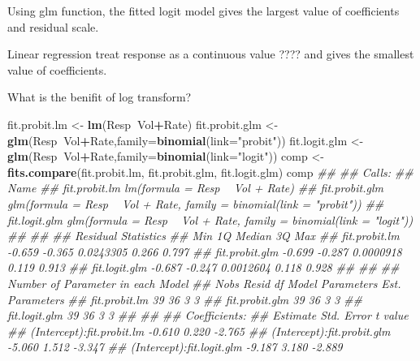 \documentclass[
]{article}
\newenvironment{Shaded}{\begin{snugshade}}{\end{snugshade}}
\newcommand{\CommentTok}[1]{\textcolor[rgb]{0.56,0.35,0.01}{\textit{#1}}}
\newcommand{\DataTypeTok}[1]{\textcolor[rgb]{0.13,0.29,0.53}{#1}}
\newcommand{\KeywordTok}[1]{\textcolor[rgb]{0.13,0.29,0.53}{\textbf{#1}}}
\newcommand{\NormalTok}[1]{#1}
\newcommand{\OperatorTok}[1]{\textcolor[rgb]{0.81,0.36,0.00}{\textbf{#1}}}
\newcommand{\StringTok}[1]{\textcolor[rgb]{0.31,0.60,0.02}{#1}}
\begin{document}
Using glm function, the fitted logit model gives the largest value of
coefficients and residual scale.

Linear regression treat response as a continuous value {????} and gives
the smallest value of coefficients.

What is the benifit of log transform?

\begin{Shaded}
\begin{Highlighting}[]
\NormalTok{fit.probit.lm <-}\StringTok{ }\KeywordTok{lm}\NormalTok{(Resp}\OperatorTok{~}\NormalTok{Vol}\OperatorTok{+}\NormalTok{Rate)}
\NormalTok{fit.probit.glm <-}\StringTok{ }\KeywordTok{glm}\NormalTok{(Resp}\OperatorTok{~}\NormalTok{Vol}\OperatorTok{+}\NormalTok{Rate,}\DataTypeTok{family=}\KeywordTok{binomial}\NormalTok{(}\DataTypeTok{link=}\StringTok{"probit"}\NormalTok{))}
\NormalTok{fit.logit.glm <-}\StringTok{ }\KeywordTok{glm}\NormalTok{(Resp}\OperatorTok{~}\NormalTok{Vol}\OperatorTok{+}\NormalTok{Rate,}\DataTypeTok{family=}\KeywordTok{binomial}\NormalTok{(}\DataTypeTok{link=}\StringTok{"logit"}\NormalTok{))}
\NormalTok{comp <-}\StringTok{ }\KeywordTok{fits.compare}\NormalTok{(fit.probit.lm, fit.probit.glm, fit.logit.glm)}
\NormalTok{comp}
\CommentTok{## }
\CommentTok{## Calls: }
\CommentTok{## Name}
\CommentTok{## fit.probit.lm     lm(formula = Resp ~ Vol + Rate)}
\CommentTok{## fit.probit.glm    glm(formula = Resp ~ Vol + Rate, family = binomial(link = "probit"))}
\CommentTok{## fit.logit.glm     glm(formula = Resp ~ Vol + Rate, family = binomial(link = "logit"))}
\CommentTok{## }
\CommentTok{## }
\CommentTok{## Residual Statistics}
\CommentTok{##                   Min     1Q    Median    3Q   Max}
\CommentTok{## fit.probit.lm  -0.659 -0.365 0.0243305 0.266 0.797}
\CommentTok{## fit.probit.glm -0.699 -0.287 0.0000918 0.119 0.913}
\CommentTok{## fit.logit.glm  -0.687 -0.247 0.0012604 0.118 0.928}
\CommentTok{## }
\CommentTok{## }
\CommentTok{## Number of Parameter in each Model}
\CommentTok{##                Nobs Resid df Model Parameters Est. Parameters}
\CommentTok{## fit.probit.lm    39       36                3               3}
\CommentTok{## fit.probit.glm   39       36                3               3}
\CommentTok{## fit.logit.glm    39       36                3               3}
\CommentTok{## }
\CommentTok{## }
\CommentTok{## Coefficients:}
\CommentTok{##                            Estimate Std. Error t value}
\CommentTok{## (Intercept):fit.probit.lm  -0.610    0.220     -2.765 }
\CommentTok{## (Intercept):fit.probit.glm -5.060    1.512     -3.347 }
\CommentTok{## (Intercept):fit.logit.glm  -9.187    3.180     -2.889 }

\end{Highlighting}
\end{Shaded}
\end{document}
